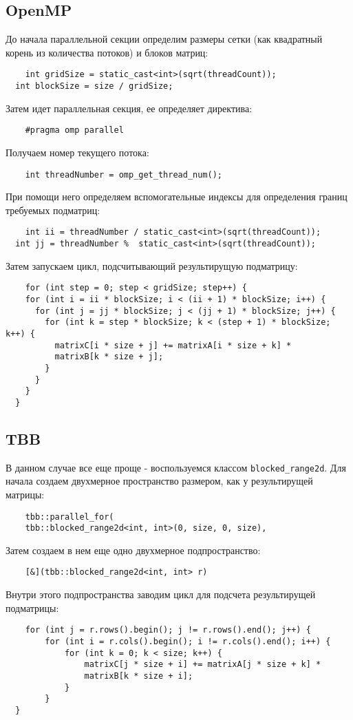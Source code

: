 \documentclass{article}
\begin{document}
\subsection*{OpenMP}
\setcounter{subsection}{1}
До начала параллельной секции определим размеры сетки (как квадратный корень из количества потоков) и блоков матриц:
\begin{lstlisting}
	int gridSize = static_cast<int>(sqrt(threadCount));
  int blockSize = size / gridSize;
\end{lstlisting}
Затем идет параллельная секция, ее определяет директива:
\begin{lstlisting}
	#pragma omp parallel
\end{lstlisting}
Получаем номер текущего потока:
\begin{lstlisting}
	int threadNumber = omp_get_thread_num();
\end{lstlisting}
При помощи него определяем вспомогательные индексы для определения границ требуемых подматриц:
\begin{lstlisting}
	int ii = threadNumber / static_cast<int>(sqrt(threadCount));
  int jj = threadNumber %  static_cast<int>(sqrt(threadCount));
\end{lstlisting}
Затем запускаем цикл, подсчитывающий результирущую подматрицу:
\begin{lstlisting}
	for (int step = 0; step < gridSize; step++) {
    for (int i = ii * blockSize; i < (ii + 1) * blockSize; i++) {
      for (int j = jj * blockSize; j < (jj + 1) * blockSize; j++) {
        for (int k = step * blockSize; k < (step + 1) * blockSize; k++) {
          matrixC[i * size + j] += matrixA[i * size + k] *
          matrixB[k * size + j];
        }
      }
    }
  }
\end{lstlisting}
\newpage

\subsection*{TBB}
В данном случае все еще проще - воспользуемся классом \lstinline$blocked_range2d$.
Для начала создаем двухмерное пространство размером, как у результирущей матрицы:
\begin{lstlisting}
	tbb::parallel_for(
    tbb::blocked_range2d<int, int>(0, size, 0, size),
\end{lstlisting}
Затем создаем в нем еще одно двухмерное подпространство:
\begin{lstlisting}
	[&](tbb::blocked_range2d<int, int> r)
\end{lstlisting}
Внутри этого подпространства заводим цикл для подсчета результирущей подматрицы:
\begin{lstlisting}
	for (int j = r.rows().begin(); j != r.rows().end(); j++) {
		for (int i = r.cols().begin(); i != r.cols().end(); i++) {
			for (int k = 0; k < size; k++) {
				matrixC[j * size + i] += matrixA[j * size + k] *
				matrixB[k * size + i];
			}          
		}
  }
\end{lstlisting} 
\newpage
\end{document}
